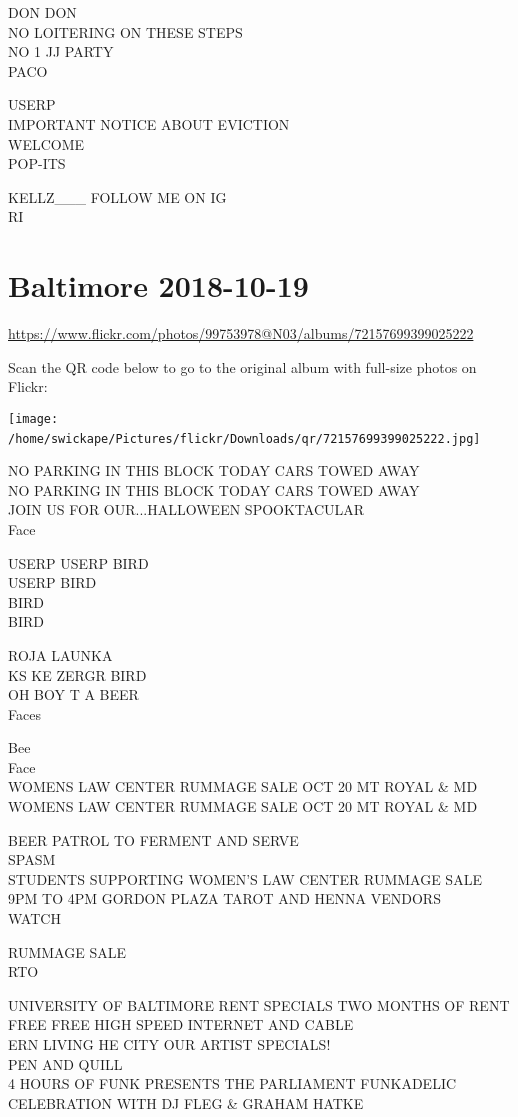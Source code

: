 \documentclass[10pt,letterpaper]{article}
\begin{document}
DON DON\\
NO LOITERING ON THESE STEPS\\
NO 1 JJ PARTY\\
PACO

USERP\\
IMPORTANT NOTICE ABOUT EVICTION\\
WELCOME\\
POP{-}ITS

KELLZ\_\_\_ FOLLOW ME ON IG\\
RI
\

\section*{Baltimore 2018-10-19}

\url{https://www.flickr.com/photos/99753978@N03/albums/72157699399025222}

Scan the QR code below to go to the original album with full-size photos on Flickr:

\texttt{[image: /home/swickape/Pictures/flickr/Downloads/qr/72157699399025222.jpg]}
\

NO PARKING IN THIS BLOCK TODAY CARS TOWED AWAY\\
NO PARKING IN THIS BLOCK TODAY CARS TOWED AWAY\\
JOIN US FOR OUR...HALLOWEEN SPOOKTACULAR\\
Face

USERP USERP BIRD\\
USERP BIRD\\
BIRD\\
BIRD

ROJA LAUNKA\\
KS KE ZERGR BIRD\\
OH BOY T A BEER\\
Faces

Bee\\
Face\\
WOMENS LAW CENTER RUMMAGE SALE OCT 20 MT ROYAL \& MD\\
WOMENS LAW CENTER RUMMAGE SALE OCT 20 MT ROYAL \& MD

BEER PATROL TO FERMENT AND SERVE\\
SPASM\\
STUDENTS SUPPORTING WOMEN'S LAW CENTER RUMMAGE SALE 9PM TO 4PM GORDON PLAZA TAROT AND HENNA VENDORS\\
WATCH

RUMMAGE SALE\\
RTO

UNIVERSITY OF BALTIMORE RENT SPECIALS TWO MONTHS OF RENT FREE FREE HIGH SPEED INTERNET AND CABLE\\
ERN LIVING HE CITY OUR ARTIST SPECIALS!\\
PEN AND QUILL\\
4 HOURS OF FUNK PRESENTS THE PARLIAMENT FUNKADELIC CELEBRATION WITH DJ FLEG \& GRAHAM HATKE
\end{document}
